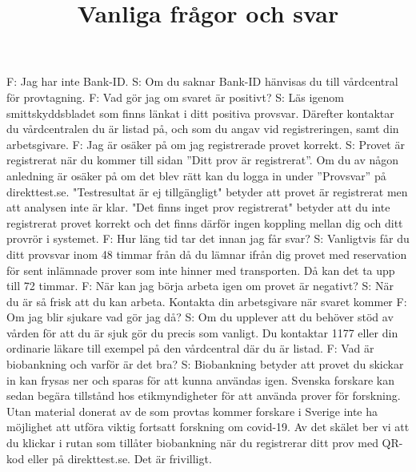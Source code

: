 \title{
Vanliga frågor och svar
}
F: Jag har inte Bank-ID.
S: Om du saknar Bank-ID hänvisas du till vårdcentral för provtagning.
F: Vad gör jag om svaret är positivt?
S: Läs igenom smittskyddsbladet som finns länkat i ditt positiva provsvar. Därefter kontaktar du vårdcentralen du är listad på, och som du angav vid registreringen, samt din arbetsgivare.
F: Jag är osäker på om jag registrerade provet korrekt.
S: Provet är registrerat när du kommer till sidan ”Ditt prov är registrerat”. Om du av någon anledning är osäker på om det blev rätt kan du logga in under ”Provsvar” på direkttest.se. "Testresultat är ej tillgängligt" betyder att provet är registrerat men att analysen inte är klar. "Det finns inget prov registrerat" betyder att du inte registrerat provet korrekt och det finns därför ingen koppling mellan dig och ditt provrör i systemet.
F: Hur läng tid tar det innan jag får svar?
S: Vanligtvis får du ditt provsvar inom 48 timmar från då du lämnar ifrån dig provet med reservation för sent inlämnade prover som inte hinner med transporten. Då kan det ta upp till 72 timmar.
F: När kan jag börja arbeta igen om provet är negativt?
S: När du är så frisk att du kan arbeta. Kontakta din arbetsgivare när svaret kommer
F: Om jag blir sjukare vad gör jag då?
S: Om du upplever att du behöver stöd av vården för att du är sjuk gör du precis som vanligt. Du kontaktar 1177 eller din ordinarie läkare till exempel på den vårdcentral där du är listad.
F: Vad är biobankning och varför är det bra?
S: Biobankning betyder att provet du skickar in kan frysas ner och sparas för att kunna användas igen. Svenska forskare kan sedan begära tillstånd hos etikmyndigheter för att använda prover för forskning. Utan material donerat av de som provtas kommer forskare i Sverige inte ha möjlighet att utföra viktig fortsatt forskning om covid-19. Av det skälet ber vi att du klickar i rutan som tillåter biobankning när du registrerar ditt prov med QR-kod eller på direkttest.se. Det är frivilligt.


